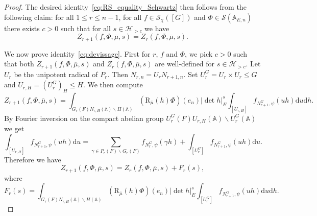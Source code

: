 \documentclass[letterpaper,11pt]{amsart}
\newcommand{\bA}{\mathbb{A}}
\newcommand{\cS}{\mathcal{S}}
\newcommand{\rd}{\mathrm{d}}
\newcommand{\<}{\negthickspace}
\theoremstyle{definition}
\theoremstyle{plain}
\theoremstyle{remark}
\numberwithin{equation}{section}
\begin{document}
\begin{proof}
The desired identity~\eqref{eq:RS_equality_Schwartz} then follows from the following claim: for all $1
\leq r \leq n-1$, for all $f \in \cS_{\chi}([G])$ and $\Phi \in \cS(\bA_{E,n})$
there exists $c>0$ such that for all $s \in \mathcal{H}_{>c}$ we have
    \begin{equation}    \label{eq:devissage}
    Z_{r+1}(f,\Phi, \overline{\mu}, s)=Z_{r}(f,\Phi,\overline{\mu}, s).
    \end{equation}

We now prove identity~\eqref{eq:devissage}. First for $r$, $f$ and $\Phi$, we
pick $c>0$ such that both $Z_{r+1}(f,\Phi,\overline{\mu},s)$ and
$Z_{r}(f,\Phi,\overline{\mu},s)$ are well-defined for $s \in
\mathcal{H}_{>c}$. Let $U_{r}$ be the unipotent radical of $P_r$. Then
$N_{r,n} = U_{r} N_{r+1,n}$. Set $U_{r}^G = U_{r} \times U_{r} \leq
G$ and $U_{r,H} = (U_{r}^G)_H \leq H$. We then compute 
    \begin{equation*}
    Z_{r+1}(f,\Phi,\overline{\mu}, s)
    = \int_{G_r(F) N_{r,H}(\bA) \backslash H(\bA)}
    (\mathrm{R}_{\overline{\mu}}(h)\Phi)(e_n)|\det h|_E^s  \int_{[U_{r,H}]}
    f_{N_{r+1}^G, \psi}(uh)  \rd u \rd h.
    \end{equation*}
By Fourier inversion on the compact abelian group $U_{r}^G(F)
U_{r,H}(\bA) \backslash U^G_{r}(\bA)$ we get
\begin{equation*}
    \int_{[U_{r,H}]}
    f_{N_{r+1}^G, \psi}(uh)  \rd u =\sum_{\gamma \in P_r(F) \backslash G_r(F) } f_{N_{r}^G, \psi}(\gamma h) + \int_{[U_{r}^G]} f_{N_{r+1}^G, \psi}(u h)\rd u.
\end{equation*}
Therefore we have
    \begin{equation*}
    Z_{r+1}(f,\Phi, \overline{\mu}, s)=
    Z_{r}(f,\Phi,\overline{\mu},s)+F_r(s),
    \end{equation*}
where
    \begin{equation*}
    F_r(s)=\int_{G_r(F) N_{r,H}(\bA) \backslash H(\bA)}
    (\mathrm{R}_{\overline{\mu}}(h)\Phi)(e_n) |\det h|_E^s  \int_{[U_{r}^G]}
    f_{N^G_{r+1},\psi}(uh)  \rd u \rd h.
    \end{equation*}


\end{proof}
\end{document}
